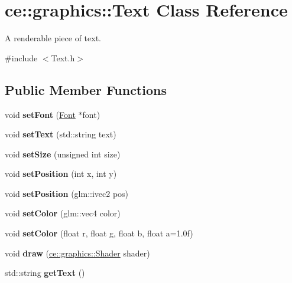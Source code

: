 \hypertarget{classce_1_1graphics_1_1_text}{}\section{ce\+:\+:graphics\+:\+:Text Class Reference}
\label{classce_1_1graphics_1_1_text}


A renderable piece of text.  




{\ttfamily \#include $<$Text.\+h$>$}

\subsection*{Public Member Functions}
\begin{DoxyCompactItemize}
\item 
\mbox{\label{classce_1_1graphics_1_1_text_a54e3ef845a5ae19f298f84c768280fb2}} 
void {\bfseries set\+Font} (\hyperlink{classce_1_1graphics_1_1_font}{Font} $\ast$font)
\item 
\mbox{\label{classce_1_1graphics_1_1_text_a6d91d8e541393513dc999cb9f7627ee5}} 
void {\bfseries set\+Text} (std\+::string text)
\item 
\mbox{\label{classce_1_1graphics_1_1_text_a7f3a666a2a6a0725a61c1cecc437d832}} 
void {\bfseries set\+Size} (unsigned int size)
\item 
\mbox{\label{classce_1_1graphics_1_1_text_ac9757fb654ae91f3c80eb04f1e7422f9}} 
void {\bfseries set\+Position} (int x, int y)
\item 
\mbox{\label{classce_1_1graphics_1_1_text_a97ceb3ee07e53939d0de53546147ef21}} 
void {\bfseries set\+Position} (glm\+::ivec2 pos)
\item 
\mbox{\label{classce_1_1graphics_1_1_text_a65b3eeebadc7b36bffe6abc5fcaf7256}} 
void {\bfseries set\+Color} (glm\+::vec4 color)
\item 
\mbox{\label{classce_1_1graphics_1_1_text_a4a88235e0f0a7c5e3b5c529f637a1d49}} 
void {\bfseries set\+Color} (float r, float g, float b, float a=1.\+0f)
\item 
\mbox{\label{classce_1_1graphics_1_1_text_a069d0ec7f8f03fc12228d1fb1f407f27}} 
void {\bfseries draw} (\hyperlink{classce_1_1graphics_1_1_shader}{ce\+::graphics\+::\+Shader} shader)
\item 
\mbox{\label{classce_1_1graphics_1_1_text_ac7e5b5679947244d96cc4d592d364936}} 
std\+::string {\bfseries get\+Text} ()
\end{DoxyCompactItemize}
